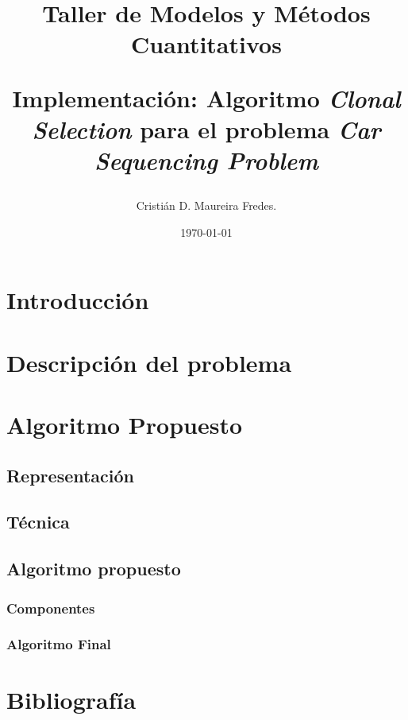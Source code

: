 \documentclass[letter, 10pt]{article}
\begin{document}
\title{Taller de Modelos y Métodos Cuantitativos \\ \begin{Large}Implementación: Algoritmo \emph{Clonal Selection} para el problema \emph{Car Sequencing Problem}\end{Large}}
\author{Cristián D. Maureira Fredes.}
\date{\today}
\maketitle

\section{Introducción}

\label{sec:introduccion}

\section{Descripción del problema}

\label{sec:descripcionProblema}

\section{Algoritmo Propuesto}

\subsection{Representación}

\label{sec:representacion}

\subsection{Técnica}

\label{sec:tecnica}

\subsection{Algoritmo propuesto}
\subsubsection{Componentes}

\label{sec:componentes}

\subsubsection{Algoritmo Final}

\label{sec:algoritmo}

\section{Bibliografía}
%
\end{document}
